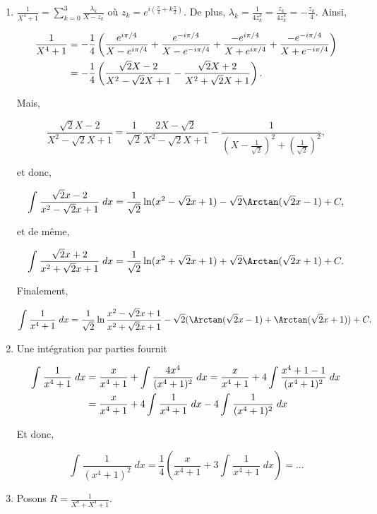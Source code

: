 {{\begin{enumerate}
Finalement,

$$\int_{}^{}\frac{x^2+x}{x^6+1}\;dx=\frac{1}{3}\Arctan(x^3)+\frac{1}{6}\ln\frac{(x^2-1)^2}{x^4-x^2+1}+\frac{1}{\sqrt{3}}\Arctan\frac{2x^2-1}{\sqrt{3}}+C.$$

\item  $\frac{1}{X^4+1}=\sum_{k=0}^{3}\frac{\lambda_k}{X-z_k}$ où $z_k=e^{i(\frac{\pi}{4}+k\frac{\pi}{2})}$. De plus,
$\lambda_k=\frac{1}{4z_k^3}=\frac{z_k}{4z_k^4}=-\frac{z_k}{4}$. Ainsi,

\begin{align*}\ensuremath
\frac{1}{X^4+1}&=-\frac{1}{4}\left(\frac{e^{i\pi/4}}{X-e^{i\pi/4}}+\frac{e^{-i\pi/4}}{X-e^{-i\pi/4}}
+\frac{-e^{i\pi/4}}{X+e^{i\pi/4}}+\frac{-e^{-i\pi/4}}{X+e^{-i\pi/4}}\right)\\
 &=-\frac{1}{4}\left(\frac{\sqrt{2}X-2}{X^2-\sqrt{2}X+1}-\frac{\sqrt{2}X+2}{X^2+\sqrt{2}X+1}\right).
\end{align*}

Mais,

$$\frac{\sqrt{2}X-2}{X^2-\sqrt{2}X+1}=\frac{1}{\sqrt{2}}\frac{2X-\sqrt{2}}{X^2-\sqrt{2}X+1}-\frac{1}{(X-\frac{1}{\sqrt{2}})^2+(\frac{1}{\sqrt{2}})^2},$$

et donc,

$$\int_{}^{}\frac{\sqrt{2}x-2}{x^2-\sqrt{2}x+1}\;dx=\frac{1}{\sqrt{2}}\ln(x^2-\sqrt{2}x+1)-\sqrt{2}\Arctan(\sqrt{2}x-1)+C,$$

et de même,

$$\int_{}^{}\frac{\sqrt{2}x+2}{x^2+\sqrt{2}x+1}\;dx=\frac{1}{\sqrt{2}}\ln(x^2+\sqrt{2}x+1)+\sqrt{2}\Arctan(\sqrt{2}x+1)+C.$$

Finalement,

$$\int_{}^{}\frac{1}{x^4+1}\;dx=\frac{1}{\sqrt{2}}\ln\frac{x^2-\sqrt{2}x+1}{x^2+\sqrt{2}x+1}-\sqrt{2}(\Arctan(\sqrt{2}x-1)+\Arctan(\sqrt{2}x+1))+C.$$
\item  Une intégration par parties fournit

\begin{align*}\ensuremath
\int_{}^{}\frac{1}{x^4+1}\;dx&=\frac{x}{x^4+1}+\int_{}^{}\frac{4x^4}{(x^4+1)^2}\;dx=\frac{x}{x^4+1}+4\int_{}^{}\frac{x^4+1-1}{(x^4+1)^2}\;dx\\
 &=\frac{x}{x^4+1}+4\int_{}^{}\frac{1}{x^4+1}\;dx-4\int_{}^{}\frac{1}{(x^4+1)^2}\;dx\\
\end{align*}

Et donc,

$$\int_{}^{}\frac{1}{(x^4+1)^2}\;dx=\frac{1}{4}(\frac{x}{x^4+1}+3\int_{}^{}\frac{1}{x^4+1}\;dx)=...$$
\item  Posons $R=\frac{1}{X^8+X^4+1}$.


\end{enumerate}}}
